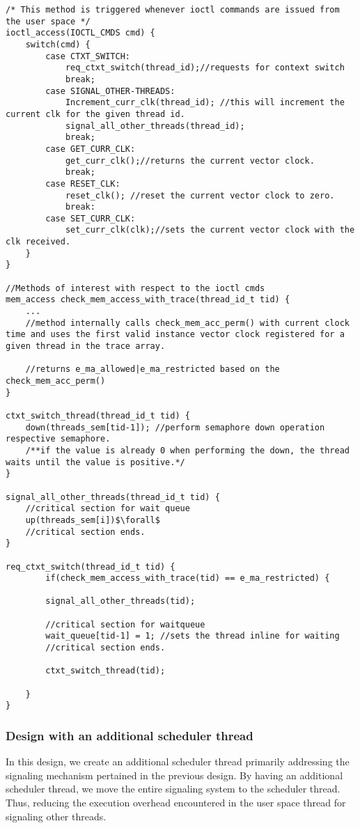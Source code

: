\begin{lstlisting}[title=Kernel Space - IOCTL, style=customc]
/* This method is triggered whenever ioctl commands are issued from the user space */
ioctl_access(IOCTL_CMDS cmd) {	
	switch(cmd) {
		case CTXT_SWITCH: 
			req_ctxt_switch(thread_id);//requests for context switch
			break;
		case SIGNAL_OTHER-THREADS:
			Increment_curr_clk(thread_id); //this will increment the current clk for the given thread id.
			signal_all_other_threads(thread_id);
			break;
		case GET_CURR_CLK:
			get_curr_clk();//returns the current vector clock.
			break;
		case RESET_CLK:
			reset_clk(); //reset the current vector clock to zero.
			break:		
		case SET_CURR_CLK:
			set_curr_clk(clk);//sets the current vector clock with the clk received.
	}
}

//Methods of interest with respect to the ioctl cmds
mem_access check_mem_access_with_trace(thread_id_t tid) {
	...
	//method internally calls check_mem_acc_perm() with current clock time and uses the first valid instance vector clock registered for a given thread in the trace array.
		
	//returns e_ma_allowed|e_ma_restricted based on the check_mem_acc_perm()
}

ctxt_switch_thread(thread_id_t tid) {	
	down(threads_sem[tid-1]); //perform semaphore down operation respective semaphore.
	/**if the value is already 0 when performing the down, the thread waits until the value is positive.*/
}

signal_all_other_threads(thread_id_t tid) {
	//critical section for wait queue
	up(threads_sem[i])$\forall$	
	//critical section ends.
}

req_ctxt_switch(thread_id_t tid) {
		if(check_mem_access_with_trace(tid) == e_ma_restricted) {

		signal_all_other_threads(tid);
		
		//critical section for waitqueue
		wait_queue[tid-1] = 1; //sets the thread inline for waiting
		//critical section ends.
		
		ctxt_switch_thread(tid);

	}
}

\end{lstlisting}

\subsubsection{Design with an additional scheduler thread}\label{sec_add_thread}

In this design, we create an additional scheduler thread primarily addressing the signaling mechanism pertained in the previous design. 
By having an additional scheduler thread, we move the entire signaling system to the scheduler thread.
Thus, reducing the execution overhead encountered in the user space thread for signaling other threads.


